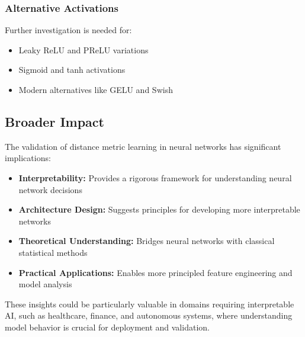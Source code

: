 \subsubsection{Alternative Activations}
Further investigation is needed for:
\begin{itemize}
    \item Leaky ReLU and PReLU variations
    \item Sigmoid and tanh activations
    \item Modern alternatives like GELU and Swish
\end{itemize}

\subsection{Broader Impact}

The validation of distance metric learning in neural networks has significant implications:

\begin{itemize}
    \item \textbf{Interpretability:} Provides a rigorous framework for understanding neural network decisions
    \item \textbf{Architecture Design:} Suggests principles for developing more interpretable networks
    \item \textbf{Theoretical Understanding:} Bridges neural networks with classical statistical methods
    \item \textbf{Practical Applications:} Enables more principled feature engineering and model analysis
\end{itemize}

These insights could be particularly valuable in domains requiring interpretable AI, such as healthcare, finance, and autonomous systems, where understanding model behavior is crucial for deployment and validation. 